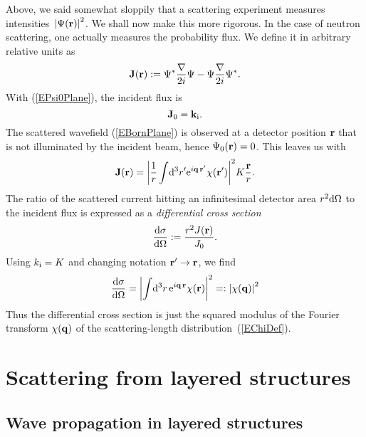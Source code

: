 Above, we said somewhat sloppily
that a scattering experiment measures intensities~${|\Psi(\mathbf{r})|}^2$.
We shall now make this more rigorous.
In the case of neutron scattering,
one actually measures the probability flux.
We define it in arbitrary relative units as
\begin{equation}
  \mathbf{J}(\mathbf{r}) := \Psi^*\frac{\mathbf{\nabla}}{2i}\Psi - \Psi\frac{\mathbf{\nabla}}{2i}\Psi^*.
\end{equation}
With (\ref{EPsi0Plane}), the incident flux is
\begin{equation}
  \mathbf{J}_0 = \mathbf{k}_{\rm i}.
\end{equation}
The scattered wavefield (\ref{EBornPlane}) is observed
at a detector position $\mathbf{r}$ that is not illuminated by the
incident beam, hence $\Psi_0(\mathbf{r})=0$.
This leaves us with
\begin{equation}
  \mathbf{J}(\mathbf{r})
  = {\left|\frac{1}{r}
    \int\!{\rm d}^3r' {\rm e}^{i\mathbf{q}\,\mathbf{r}'}\chi(\mathbf{r}')
    \right|}^2 K\frac{\mathbf{r}}{r}.
\end{equation}
The ratio of the scattered current hitting an infinitesimal detector area
$r^2{\rm d}\Omega$ to the incident flux is expressed as a
\textit{differential cross section}
\begin{equation}
  \frac{{\rm d}\sigma}{{\rm d}\Omega}
  := \frac{r^2 J(\mathbf{r})}{J_0}.
\end{equation}
Using $k_{\rm i}=K$ and changing notation $\mathbf{r}'\to\mathbf{r}$,
we find
\begin{equation}\label{Ecross1}
  \frac{{\rm d}\sigma}{{\rm d}\Omega}
  = {\left|
    \int\!{\rm d}^3r\, {\rm e}^{i\mathbf{q}\,\mathbf{r}}\chi(\mathbf{r})
    \right|}^2 =: {\left| \chi(\mathbf{q}) \right|}^2
\end{equation}
Thus the differential cross section is just the squared modulus
of the Fourier transform $\chi(\mathbf{q})$
of the scattering-length distribution~(\ref{EChiDef}).


\section{Scattering from layered structures}\label{Sdwba}

\subsection{Wave propagation in layered structures}

